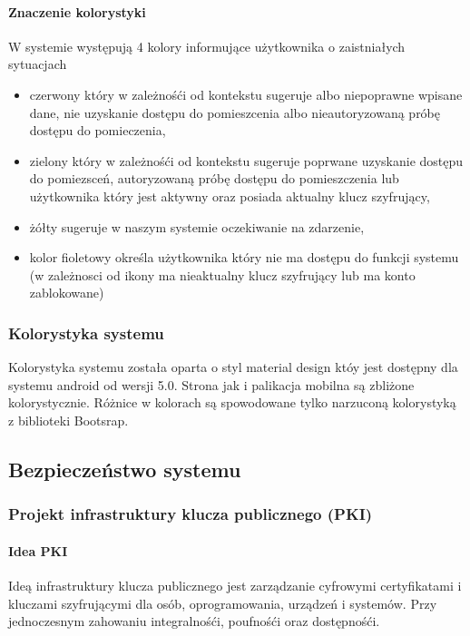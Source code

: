 	
		\paragraph{Znaczenie kolorystyki}
		W systemie występują 4 kolory informujące użytkownika o zaistniałych sytuacjach
		\begin{itemize}
			\item czerwony który w zależnośći od kontekstu sugeruje albo niepoprawne wpisane dane, nie uzyskanie dostępu do pomieszcenia albo nieautoryzowaną próbę dostępu do pomieczenia,
			\item zielony który w zależnośći od kontekstu sugeruje poprwane uzyskanie dostępu do pomiezsceń, autoryzowaną próbę dostępu do pomieszczenia lub użytkownika który jest aktywny oraz posiada aktualny klucz szyfrujący,
			\item żółty sugeruje w naszym systemie oczekiwanie na zdarzenie,
			\item kolor fioletowy określa użytkownika który nie ma dostępu do funkcji systemu (w zależnosci od ikony ma nieaktualny klucz szyfrujący lub ma konto zablokowane)
		\end{itemize}
		
	\subsubsection{Kolorystyka systemu}
	Kolorystyka systemu została oparta o styl material design któy jest dostępny dla systemu android od wersji 5.0. Strona jak i palikacja mobilna są zbliżone kolorystycznie. Różnice w kolorach są spowodowane tylko narzuconą kolorystyką z biblioteki Bootsrap.
	
\newpage
\subsection{Bezpieczeństwo systemu}\label{sec:Projekt bezpieczeństwo}
	\subsubsection{Projekt infrastruktury klucza publicznego (PKI)}\label{sec:Projekt PKI}
		\paragraph*{Idea PKI}
		Ideą infrastruktury klucza publicznego jest zarządzanie cyfrowymi certyfikatami i kluczami szyfrującymi dla osób, oprogramowania, urządzeń i systemów. Przy jednoczesnym zahowaniu integralnośći, poufnośći oraz dostępnośći.
